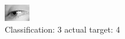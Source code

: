 \begin{figure}[h!]
\begin{center}
\includegraphics[width=0.60\columnwidth]{figures/ID3052_class_3_target_4.png}
\end{center}
\caption{ Classification: 3 actual target: 4}
\label{fig:ID3052_class_3_target_4}
\end{figure}
